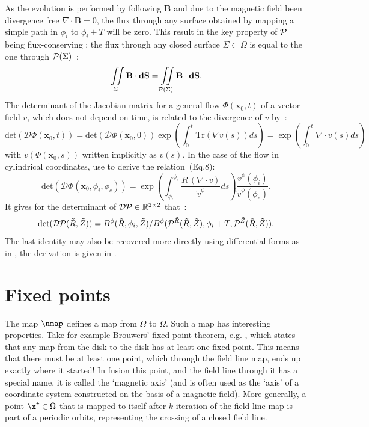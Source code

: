 As the evolution is performed by following $\mathbf{B}$ and due to the magnetic field been divergence free $\nabla\cdot\textbf{B} = 0$, the flux through any surface obtained by mapping a simple path in $\phi_i$ to $\phi_i + T$ will be zero. This result in the key property of $\mathcal{P}$ being flux-conserving ; the flux through any closed surface $\Sigma \subset \Omega$ is equal to the one through $\mathcal{P}(\Sigma)$~:
\begin{equation*}
    \iint\limits_{\Sigma}\textbf{B}\cdot\textbf{dS} = \iint\limits_{\mathcal{P}(\Sigma)}\textbf{B}\cdot\textbf{dS}.
\end{equation*}
The determinant of the Jacobian matrix for a general flow $\Phi(\textbf{x}_0, t)$ of a vector field $v$, which does not depend on time, is related to the divergence of $v$ \cite[p.408]{hirsch_differential_2013} by~:
\begin{equation}\label{eq:det-div-flow}
    \text{det}(\mathcal{D}\Phi(\textbf{x}_0, t)) = \text{det}(\mathcal{D}\Phi(\textbf{x}_0, 0))\exp\left(\int_0^t\text{Tr}(\nabla v(s)) ds\right) = \exp\left(\int_0^t \nabla\cdot v(s) ds\right)
\end{equation}
with $v(\Phi(\textbf{x}_0, s))$ written implicitly as $v(s)$. In the case of the flow in cylindrical coordinates, \citeauthor{wei_invariant_2023} use  to derive the relation~(Eq.8):
\begin{equation*}\label{eq:det-div-pmap}
    \text{det}(\mathcal{D}\Phi(\textbf{x}_0, \phi_i, \phi_e)) = \exp\left(\int_{\phi_i}^{\phi_e} \frac{R\,(\nabla\cdot v)}{\tilde{v}^\phi} ds\right)\frac{\tilde{v}^\phi(\phi_i)}{\tilde{v}^\phi(\phi_e)}.
\end{equation*}
It gives for the determinant of $\mathcal{D}\mathcal{P} \in \mathbb{R}^{2\times2}$ that~:
\begin{equation}\label{eq:pmap-det}
    \text{det}(\mathcal{D}\mathcal{P}(\tilde{R}, \tilde{Z})) = B^\phi(\tilde{R},\phi_i, \tilde{Z})/B^\phi(\mathcal{P}^{\tilde{R}}(\tilde{R},\tilde{Z}), \phi_i+T,\mathcal{P}^{\tilde{Z}}(\tilde{R},\tilde{Z})).
\end{equation}
The last identity may also be recovered more directly using differential forms as in \cite{meiss_thirty_2015}, the derivation is given in .

\section{Fixed points}

The map $\nmap$  defines a map from $\Omega$ to $\Omega$. Such a map has interesting properties. Take for example Brouwers' fixed point theorem, e.g. \cite{michel_chipot_handbook_2008}, which states that any map from the disk to the disk has at least one fixed point. This means that there must be at least one point, which through the field line map, ends up exactly where it started! In fusion this point, and the field line through it has a special name, it is called the `magnetic axis' (and is often used as the `axis' of a coordinate system constructed on the basis of a magnetic field). More generally, a point $\x^\star\in\Omega$ that is mapped to itself after $k$ iteration of the field line map is part of a periodic orbits, representing the crossing of a closed field line.


